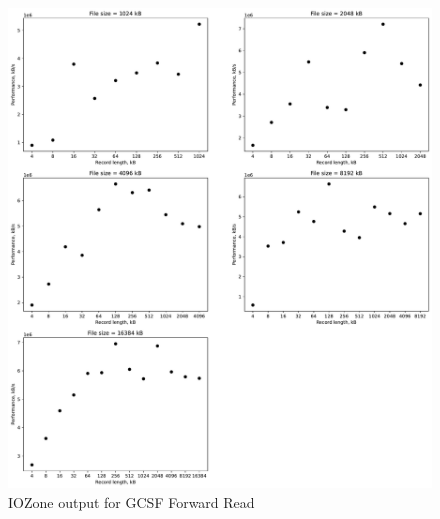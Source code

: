 \begin{figure}[!htb]
	\label{fig:app_bgcsfh_ffs_read}
	\begin{center}
		\includegraphics[width=1.0\textwidth]{figures/benchmarking/gcsf/Read.pdf}
	\end{center}
	\caption{IOZone output for GCSF Forward Read}
\end{figure}


